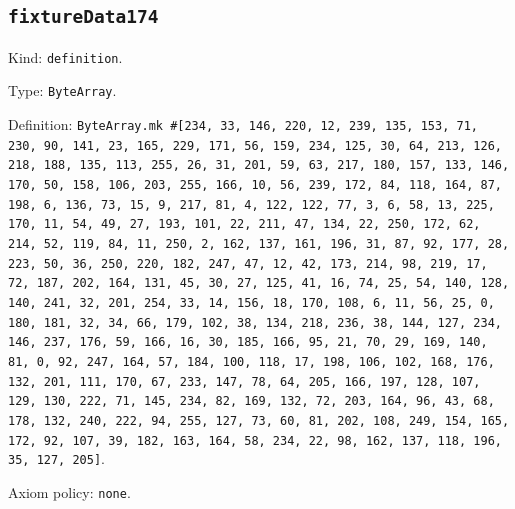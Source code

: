 \documentclass[11pt]{article}
\begin{document}
\subsection*{\texttt{fixtureData174}}
\noindent Kind: \texttt{definition}.\par
\noindent Type: \texttt{ByteArray}.\par
\noindent Definition: \texttt{ByteArray.mk \#[234, 33, 146, 220, 12, 239, 135, 153, 71, 230, 90, 141, 23, 165, 229, 171, 56, 159, 234, 125, 30, 64, 213, 126, 218, 188, 135, 113, 255, 26, 31, 201, 59, 63, 217, 180, 157, 133, 146, 170, 50, 158, 106, 203, 255, 166, 10, 56, 239, 172, 84, 118, 164, 87, 198, 6, 136, 73, 15, 9, 217, 81, 4, 122, 122, 77, 3, 6, 58, 13, 225, 170, 11, 54, 49, 27, 193, 101, 22, 211, 47, 134, 22, 250, 172, 62, 214, 52, 119, 84, 11, 250, 2, 162, 137, 161, 196, 31, 87, 92, 177, 28, 223, 50, 36, 250, 220, 182, 247, 47, 12, 42, 173, 214, 98, 219, 17, 72, 187, 202, 164, 131, 45, 30, 27, 125, 41, 16, 74, 25, 54, 140, 128, 140, 241, 32, 201, 254, 33, 14, 156, 18, 170, 108, 6, 11, 56, 25, 0, 180, 181, 32, 34, 66, 179, 102, 38, 134, 218, 236, 38, 144, 127, 234, 146, 237, 176, 59, 166, 16, 30, 185, 166, 95, 21, 70, 29, 169, 140, 81, 0, 92, 247, 164, 57, 184, 100, 118, 17, 198, 106, 102, 168, 176, 132, 201, 111, 170, 67, 233, 147, 78, 64, 205, 166, 197, 128, 107, 129, 130, 222, 71, 145, 234, 82, 169, 132, 72, 203, 164, 96, 43, 68, 178, 132, 240, 222, 94, 255, 127, 73, 60, 81, 202, 108, 249, 154, 165, 172, 92, 107, 39, 182, 163, 164, 58, 234, 22, 98, 162, 137, 118, 196, 35, 127, 205]}.\par
\noindent Axiom policy: \texttt{none}.\par
\end{document}
